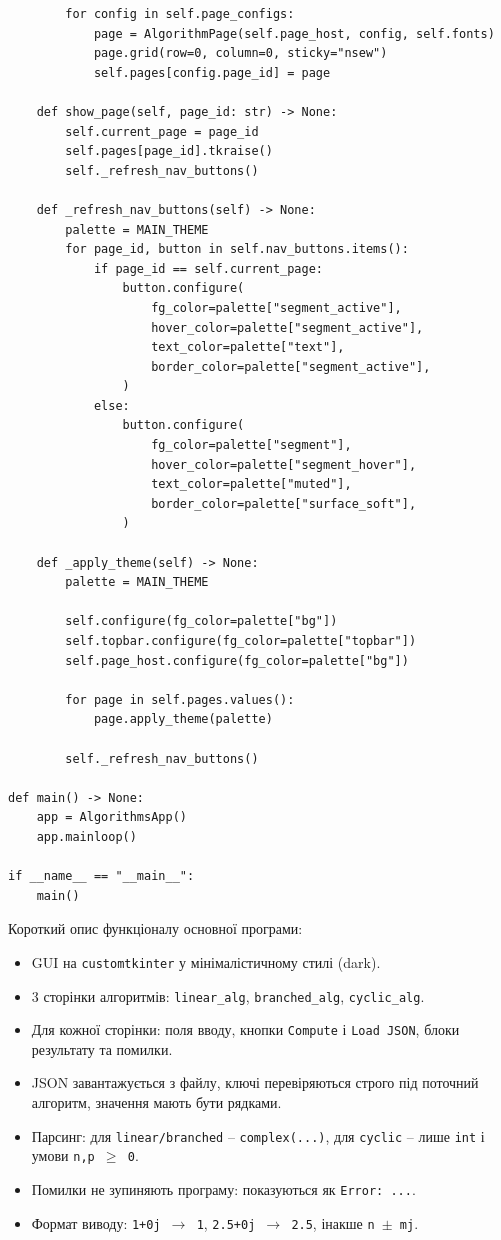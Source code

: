 \documentclass[12pt,a4paper]{article}
\begin{document}
\begin{verbatim}
        for config in self.page_configs:
            page = AlgorithmPage(self.page_host, config, self.fonts)
            page.grid(row=0, column=0, sticky="nsew")
            self.pages[config.page_id] = page

    def show_page(self, page_id: str) -> None:
        self.current_page = page_id
        self.pages[page_id].tkraise()
        self._refresh_nav_buttons()

    def _refresh_nav_buttons(self) -> None:
        palette = MAIN_THEME
        for page_id, button in self.nav_buttons.items():
            if page_id == self.current_page:
                button.configure(
                    fg_color=palette["segment_active"],
                    hover_color=palette["segment_active"],
                    text_color=palette["text"],
                    border_color=palette["segment_active"],
                )
            else:
                button.configure(
                    fg_color=palette["segment"],
                    hover_color=palette["segment_hover"],
                    text_color=palette["muted"],
                    border_color=palette["surface_soft"],
                )

    def _apply_theme(self) -> None:
        palette = MAIN_THEME

        self.configure(fg_color=palette["bg"])
        self.topbar.configure(fg_color=palette["topbar"])
        self.page_host.configure(fg_color=palette["bg"])

        for page in self.pages.values():
            page.apply_theme(palette)

        self._refresh_nav_buttons()

def main() -> None:
    app = AlgorithmsApp()
    app.mainloop()

if __name__ == "__main__":
    main()
    \end{verbatim}

    \noindent
    Короткий опис функціоналу основної програми:

    \begin{itemize}
        \item GUI на \texttt{customtkinter} у мінімалістичному стилі (dark).
        \item 3 сторінки алгоритмів: \texttt{linear\_alg}, \texttt{branched\_alg}, \texttt{cyclic\_alg}.
        \item Для кожної сторінки: поля вводу, кнопки \texttt{Compute} і \texttt{Load JSON}, блоки результату та помилки.
        \item JSON завантажується з файлу, ключі перевіряються строго під поточний алгоритм, значення мають бути рядками.
        \item Парсинг: для \texttt{linear/branched} -- \texttt{complex(...)}, для \texttt{cyclic} -- лише \texttt{int} і умови \texttt{n,p $\ge$ 0}.
        \item Помилки не зупиняють програму: показуються як \texttt{Error: ...}.
        \item Формат виводу: \texttt{1+0j $\to$ 1}, \texttt{2.5+0j $\to$ 2.5}, інакше \texttt{n $\pm$ mj}.
    \end{itemize}
\end{document}
